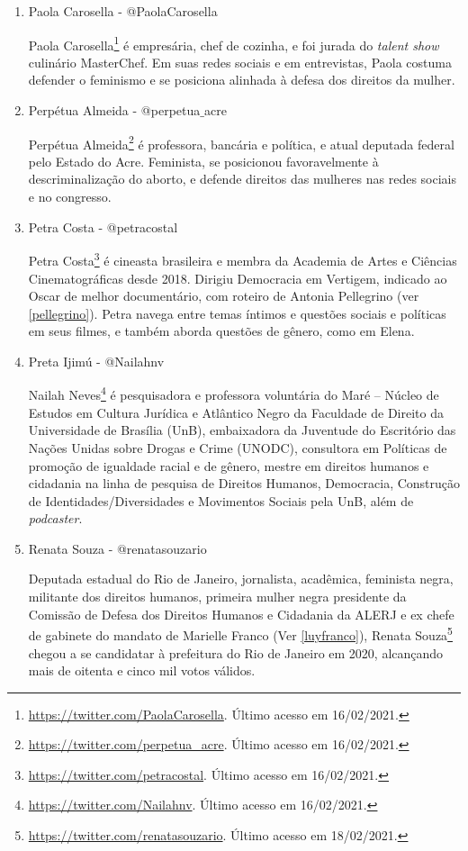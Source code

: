 \documentclass[
	12pt,				%
	openright,			%
	twoside,			%
	a4paper,			%
	english,			%
	brazil				%
	]{abntex2}
\begin{document}
\begin{anexosenv}
\begin{enumerate}
 \item Paola Carosella - @PaolaCarosella
 
 Paola Carosella\footnote{\url{https://twitter.com/PaolaCarosella}. Último acesso em 16/02/2021.} é empresária, chef de cozinha, e foi jurada do \textit{talent show} culinário MasterChef. Em suas redes sociais e em entrevistas, Paola costuma defender o feminismo e se posiciona alinhada à defesa dos direitos da mulher.

 \item Perpétua Almeida - @perpetua$\_$acre
 
 Perpétua Almeida\footnote{\url{https://twitter.com/perpetua_acre}. Último acesso em 16/02/2021.} é professora, bancária e política, e atual deputada federal pelo Estado do Acre. Feminista, se posicionou favoravelmente à descriminalização do aborto, e defende direitos das mulheres nas redes sociais e no congresso.

 \item Petra Costa - @petracostal\label{PetraCosta}
 
 Petra Costa\footnote{\url{https://twitter.com/petracostal}. Último acesso em 16/02/2021.} é cineasta brasileira e membra da Academia de Artes e Ciências Cinematográficas desde 2018. Dirigiu Democracia em Vertigem, indicado ao Oscar de melhor documentário, com roteiro de Antonia Pellegrino (ver \ref{pellegrino}). Petra navega entre temas íntimos e questões sociais e políticas em seus filmes, e também aborda questões de gênero, como em Elena.

 \item Preta Ijimú - @Nailahnv
 
 Nailah Neves\footnote{\url{https://twitter.com/Nailahnv}. Último acesso em 16/02/2021.} é pesquisadora e professora voluntária do Maré -- Núcleo de Estudos em Cultura Jurídica e Atlântico Negro da Faculdade de Direito da Universidade de Brasília (UnB), embaixadora da Juventude do Escritório das Nações Unidas sobre Drogas e Crime (UNODC), consultora em Políticas de promoção de igualdade racial e de gênero, mestre em direitos humanos e cidadania na linha de pesquisa de Direitos Humanos, Democracia, Construção de Identidades/Diversidades e Movimentos Sociais pela UnB, além de \textit{podcaster}.

 \item Renata Souza - @renatasouzario
 
 Deputada estadual do Rio de Janeiro, jornalista, acadêmica, feminista negra, militante dos direitos humanos, primeira mulher negra presidente da Comissão de Defesa dos Direitos Humanos e Cidadania da ALERJ e ex chefe de gabinete do mandato de Marielle Franco (Ver \ref{luyfranco}), Renata Souza\footnote{\url{https://twitter.com/renatasouzario}. Último acesso em 18/02/2021.} chegou a se candidatar à prefeitura do Rio de Janeiro em 2020, alcançando mais de oitenta e cinco mil votos válidos.


\end{enumerate}
\end{anexosenv}
\end{document}
